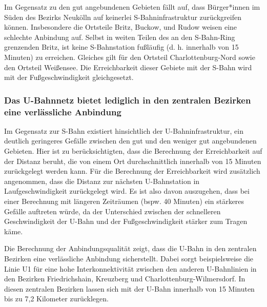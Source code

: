 Im Gegensatz zu den gut angebundenen Gebieten fällt auf, dass Bürger*innen im Süden des Bezirks Neukölln auf keinerlei S-Bahninfrastruktur zurückgreifen können. Insbesondere die Ortsteile Britz, Buckow, und Rudow weisen eine schlechte Anbindung auf. Selbst in weiten Teilen des an den S-Bahn-Ring grenzenden Britz, ist keine S-Bahnstation fußläufig (d. h. innerhalb von 15 Minuten) zu erreichen. Gleiches gilt für den Ortsteil Charlottenburg-Nord sowie den Ortsteil Weißensee. Die Erreichbarkeit dieser Gebiete mit der S-Bahn wird mit der Fußgeschwindigkeit gleichgesetzt.












\subsubsection{Das U-Bahnnetz bietet lediglich in den zentralen Bezirken eine verlässliche Anbindung}
Im Gegensatz zur S-Bahn existiert hinsichtlich der U-Bahninfrastruktur, ein deutlich geringeres Gefälle zwischen den gut und den weniger gut angebundenen Gebieten. Hier ist zu berücksichtigten, dass die Berechnung der Erreichbarkeit auf der Distanz beruht, die von einem Ort durchschnittlich innerhalb von 15 Minuten zurückgelegt werden kann. Für die Berechnung der Erreichbarkeit wird zusätzlich angenommen, dass die Distanz zur nächsten U-Bahnstation in Laufgeschwindigkeit zurückgelegt wird. Es ist also davon auszugehen, dass bei einer Berechnung mit längeren Zeiträumen (bspw. 40 Minuten) ein stärkeres Gefälle auftreten würde, da der Unterschied zwischen der schnelleren Geschwindigkeit der U-Bahn und der Fußgeschwindigkeit stärker zum Tragen käme.

Die Berechnung der Anbindungsqualität zeigt, dass die U-Bahn in den zentralen Bezirken eine verlässliche Anbindung sicherstellt. Dabei sorgt beispielsweise die Linie U1 für eine hohe Interkonnektivität zwischen den anderen U-Bahnlinien in den Bezirken Friedrichshain, Kreuzberg und Charlottenburg-Wilmersdorf. In diesen zentralen Bezirken lassen sich mit der U-Bahn innerhalb von 15 Minuten bis zu 7,2 Kilometer zurücklegen.












